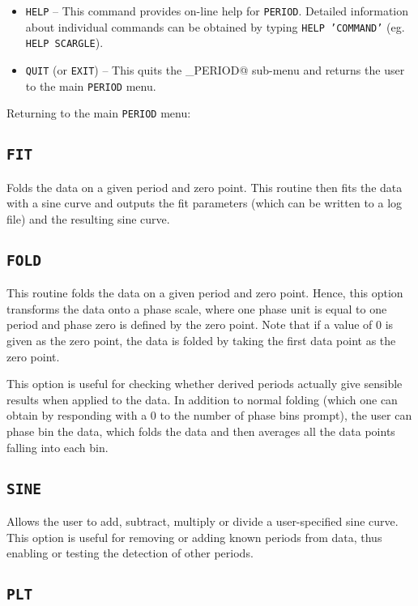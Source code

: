 \begin{itemize}
\item {\tt HELP} -- This command provides on-line help for {\tt PERIOD}. 
Detailed information about individual commands can be obtained by typing 
{\tt HELP 'COMMAND'} (eg. {\tt HELP SCARGLE}). 

\item {\tt QUIT} (or {\tt EXIT}) -- This quits the \verb@PERIOD_PERIOD@ 
sub-menu and returns the user to the main {\tt PERIOD} menu. 

\end{itemize}

Returning to the main {\tt PERIOD} menu:

\subsection*{\tt FIT}

Folds the data on a given period and zero point. This routine then fits the
data with a sine curve and outputs the fit parameters (which can be written to
a log file) and the resulting sine curve. 

\subsection*{\tt FOLD}

This routine folds the data on a given period and zero point. Hence, this
option transforms the data onto a phase scale, where one phase unit is equal to
one period and phase zero is defined by the zero point. Note that if a value of
0 is given as the zero point, the data is folded by taking the first data point
as the zero point. 

This option is useful for checking whether derived periods actually give
sensible results when applied to the data. In addition to normal folding
(which one can obtain by responding with a 0 to the number of phase bins
prompt), the user can phase bin the data, which folds the data and then
averages all the data points falling into each bin. 

\subsection*{\tt SINE}

Allows the user to add, subtract, multiply or divide a user-specified sine
curve. This option is useful for removing or adding known periods from data, 
thus enabling or testing the detection of other periods. 

\subsection*{\tt PLT}

